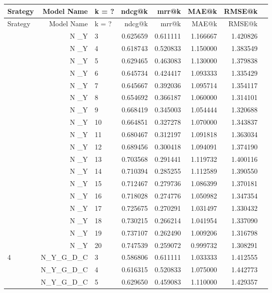 \documentclass[a4paper,12pt]{article}
\begin{document}
\begin{center}
\begin{longtable}{lrlrrrrr}
\toprule
 Srategy & Model Name & k = ? & ndcg@k & mrr@k & MAE@k & RMSE@k \\
\midrule
\endfirsthead
\toprule
 Srategy & Model Name & k = ? & ndcg@k & mrr@k & MAE@k & RMSE@k \\
\midrule
\endhead
\midrule
\endfoot
\bottomrule
\endlastfoot
\multirow{18}{1cm}{3} & N \_Y & 3 & 0.625659 & 0.611111 & 1.166667 & 1.420826 \\
 & N \_Y & 4 & 0.618743 & 0.520833 & 1.150000 & 1.383549 \\
& N \_Y & 5 & 0.629465 & 0.463083 & 1.130000 & 1.379838 \\
& N \_Y & 6 & 0.645734 & 0.424417 & 1.093333 & 1.335429 \\
& N \_Y & 7 & 0.645667 & 0.392036 & 1.095714 & 1.354117 \\
& N \_Y & 8 & 0.654692 & 0.366187 & 1.060000 & 1.314101 \\
& N \_Y & 9 & 0.668419 & 0.345003 & 1.054444 & 1.320688 \\
& N \_Y & 10 & 0.664851 & 0.327278 & 1.070000 & 1.343837 \\
& N \_Y & 11 & 0.680467 & 0.312197 & 1.091818 & 1.363034 \\
& N \_Y & 12 & 0.689456 & 0.300418 & 1.094091 & 1.374190 \\
& N \_Y & 13 & 0.703568 & 0.291441 & 1.119732 & 1.400116 \\
& N \_Y & 14 & 0.710394 & 0.285255 & 1.112589 & 1.390550 \\
& N \_Y & 15 & 0.712467 & 0.279736 & 1.086399 & 1.370181 \\
& N \_Y & 16 & 0.718028 & 0.274776 & 1.050982 & 1.347354 \\
& N \_Y & 17 & 0.725675 & 0.270291 & 1.031497 & 1.330432 \\
& N \_Y & 18 & 0.730215 & 0.266214 & 1.041954 & 1.337090 \\
& N \_Y & 19 & 0.737107 & 0.262490 & 1.009206 & 1.316798 \\
& N \_Y & 20 & 0.747539 & 0.259072 & 0.999732 & 1.308291 \\ \hline
\multirow{18}{1cm}{4} & N\_Y\_G\_D\_C & 3 & 0.586806 & 0.611111 & 1.033333 & 1.412555 \\
& N\_Y\_G\_D\_C & 4 & 0.616315 & 0.520833 & 1.075000 & 1.442773 \\
& N\_Y\_G\_D\_C & 5 & 0.629650 & 0.459083 & 1.110000 & 1.429357 \\

\end{longtable}
\end{center}
\end{document}
